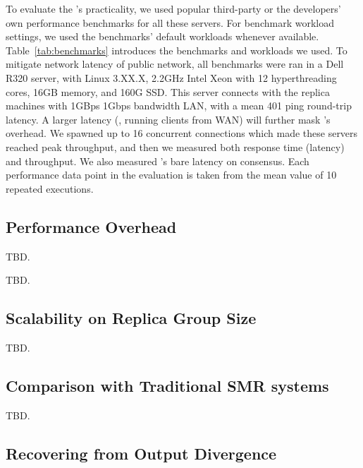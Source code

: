 To evaluate the \xxx's practicality, we used popular third-party or the 
developers' own performance benchmarks for all these servers. For benchmark 
workload settings, we used the benchmarks' default workloads whenever 
available. Table~\ref{tab:benchmarks} introduces the benchmarks and workloads 
we used. To mitigate network latency of public network, all benchmarks were 
ran in a Dell R320 server, with Linux 3.XX.X, 2.2GHz Intel Xeon with 12 
hyperthreading cores, 16GB memory, and 160G SSD. This server connects with the 
replica machines with 1GBps 1Gbps bandwidth LAN, with a mean 401 \us ping 
round-trip latency. A larger latency (\eg, running clients from WAN) will 
further mask \xxx's overhead. We spawned up to 16 concurrent connections 
which made these servers reached peak throughput, and then we measured both 
response time (latency) and throughput. We also measured \xxx's bare 
latency on consensus. Each performance data point in the evaluation is taken 
from the mean value of 10 repeated executions.




\subsection{Performance Overhead} \label{sec:overhead}

TBD.

TBD.

\subsection{Scalability on Replica Group Size} \label{sec:scalability}

TBD.

\subsection{Comparison with Traditional SMR systems} \label{sec:compare}

TBD.

\subsection{Recovering from Output Divergence} \label{sec:robust}


